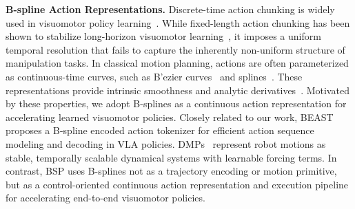 \textbf{B-spline Action Representations.} 
%
Discrete-time action chunking is widely used in visuomotor policy learning~\cite{act, dp, bidex, via, factor-dp, pi_05, re3sim}.
%
While fixed-length action chunking has been shown to stabilize long-horizon visuomotor learning~\cite{block2023provbc, mobile-aloha}, it imposes a uniform temporal resolution that fails to capture the inherently non-uniform structure of manipulation tasks.
%
%
% 
In classical motion planning, actions are often parameterized as continuous-time curves, such as B'ezier curves~\cite{bezier-for-robot-motion-plan} and splines~\cite{to-via-bsplines, bsplines-based-trajectory-design, bspline-on-gcs}. These representations provide intrinsic smoothness and analytic derivatives~\cite{grotjahn2002model, an1987experimental}. Motivated by these properties, we adopt B-splines as a continuous action representation for accelerating learned visuomotor policies.
%
%
%
Closely related to our work, BEAST~\cite{beast} proposes a B-spline encoded action tokenizer for efficient action sequence modeling and decoding in VLA policies. DMPs~\cite{ijspeert2013dynamical} represent robot motions as stable, temporally scalable dynamical systems with learnable forcing terms.
%
In contrast, BSP uses B-splines not as a trajectory encoding or motion primitive, but as a control-oriented continuous action representation and execution pipeline for accelerating end-to-end visuomotor policies.